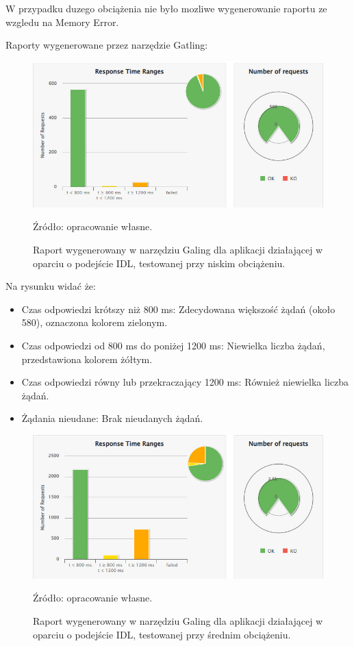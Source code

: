 \documentclass[runningheads,12pt]{llncs}
\begin{document}
W przypadku duzego obciążenia nie było mozliwe wygenerowanie raportu ze wzgledu na Memory Error.

\newpage


Raporty wygenerowane przez narzędzie Gatling: 

\begin{figure}
    \includegraphics[width=\linewidth]{images/idl-low-gatling-graph.jpg}
    \caption{Raport wygenerowany w narzędziu Galing dla aplikacji działającej w oparciu o podejście IDL, testowanej przy niskim obciążeniu.} \label{fig1}
    \vspace{0.5em}
    {\small Źródło: opracowanie własne.}
\end{figure}

Na rysunku widać że:

\begin{itemize}
    \item Czas odpowiedzi krótszy niż 800 ms: Zdecydowana większość żądań (około 580), oznaczona kolorem zielonym.
    \item Czas odpowiedzi od 800 ms do poniżej 1200 ms: Niewielka liczba żądań, przedstawiona kolorem żółtym.
    \item Czas odpowiedzi równy lub przekraczający 1200 ms: Również niewielka liczba żądań.
    \item Żądania nieudane: Brak nieudanych żądań.
\end{itemize}

\newpage

\begin{figure}
    \includegraphics[width=\linewidth]{images/idl-midle-gatling-graph.jpg}
    \caption{Raport wygenerowany w narzędziu Galing dla aplikacji działającej w oparciu o podejście IDL, testowanej przy średnim obciążeniu.} \label{fig1}
    \vspace{0.5em}
    {\small Źródło: opracowanie własne.}
\end{figure}
\end{document}
